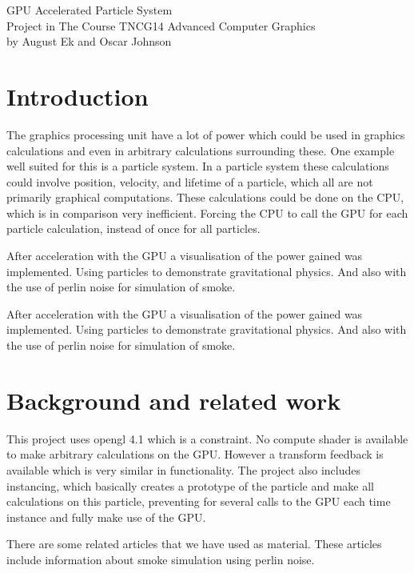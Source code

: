 \documentclass[journal]{vgtc}                %
\author{ \textbf{ Oscar Johnson} \\ \today}
\begin{document}
	\begin{titlepage}
		\begin{center} 
			{\Huge GPU Accelerated Particle System} \\[1cm]

			{\LARGE Project in The Course TNCG14 Advanced Computer Graphics} \\[0.4cm]
			{\LARGE by August Ek and Oscar Johnson}
		\end{center}


	\end{titlepage}

	

	\section{Introduction}
The graphics processing unit have a lot of power which could be used in graphics calculations and even in arbitrary calculations surrounding these. One example well suited for this is a particle system. In a particle system these calculations could involve position, velocity, and lifetime of a particle, which all are not primarily graphical computations. These calculations could be done on the CPU, which is in comparison very inefficient. Forcing the CPU to call the GPU for each particle calculation, instead of once for all particles. 

After acceleration with the GPU a visualisation of the power gained was implemented. Using particles to demonstrate gravitational physics. And also with the use of perlin noise for simulation of smoke.

After acceleration with the GPU a visualisation of the power gained was implemented. Using particles to demonstrate gravitational physics. And also with the use of perlin noise for simulation of smoke.

	\section{Background and related work}
This project uses opengl 4.1 which is a constraint. No compute shader is available to make arbitrary calculations on the GPU. However a transform feedback is available which is very similar in functionality. The project also includes instancing, which basically creates a prototype of the particle and make all calculations on this particle, preventing for several calls to the GPU each time instance and fully make use of the GPU.

There are some related articles that we have used as material. These articles include information about smoke simulation using perlin noise.
\end{document}
